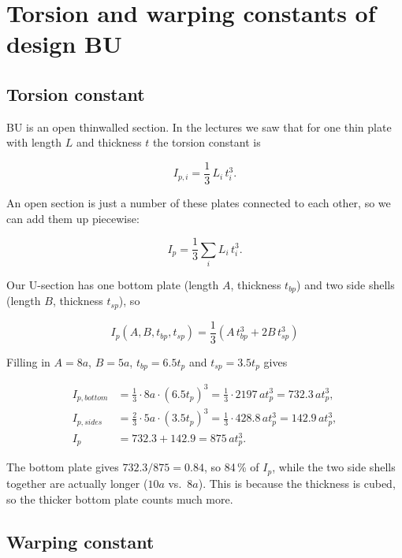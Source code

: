 \section{Torsion and warping constants of design BU}
\label{sec:a2-6}

\subsection{Torsion constant}

BU is an open thinwalled section. In the lectures we saw that for one thin plate with length $L$ and thickness $t$ the torsion constant is

\begin{equation}
  I_{p,i} = \frac{1}{3}\,L_i\,t_i^3 .
\end{equation}

An open section is just a number of these plates connected to each other, so we can add them up piecewise:

\begin{equation}
  I_p = \frac{1}{3}\sum_i L_i\,t_i^3 .
  \label{eq:a26-Ip-sum}
\end{equation}

Our U-section has one bottom plate (length $A$, thickness $t_{bp}$) and two side shells (length $B$, thickness $t_{sp}$), so

\begin{equation}
  \boxed{\;I_p(A,B,t_{bp},t_{sp}) = \frac{1}{3}\left(A\,t_{bp}^3 + 2B\,t_{sp}^3\right)\;}
  \label{eq:a26-Ip}
\end{equation}

Filling in $A=8a$, $B=5a$, $t_{bp}=6.5t_p$ and $t_{sp}=3.5t_p$ gives

\begin{align}
  I_{p,bottom} &= \tfrac{1}{3}\cdot 8a\cdot(6.5t_p)^3 = \tfrac{1}{3}\cdot 2197\,a t_p^3 = 732.3\,a t_p^3,\\
  I_{p,sides}  &= \tfrac{2}{3}\cdot 5a\cdot(3.5t_p)^3 = \tfrac{1}{3}\cdot 428.8\,a t_p^3 = 142.9\,a t_p^3,\\
  I_p &= 732.3 + 142.9 = 875\,a t_p^3 .
\end{align}

The bottom plate gives $732.3/875 = 0.84$, so 84\,\% of $I_p$, while the two side shells together are actually longer ($10a$ vs.\ $8a$). This is because the thickness is cubed, so the thicker bottom plate counts much more.

\subsection{Warping constant}

